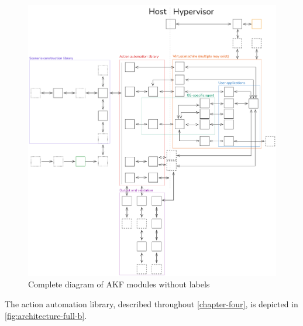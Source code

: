 \documentclass[letterpaper,12pt]{report}
\begin{document}
\begin{figure}[h]
\centering
\includegraphics[width=1\linewidth]{mini-architecture-full.png}
\caption{Complete diagram of AKF modules without
labels}\label{fig:mini-full}
\end{figure}

The action automation library, described throughout \autoref{chapter-four}, is depicted in \autoref{fig:architecture-full-b}.
\end{document}
